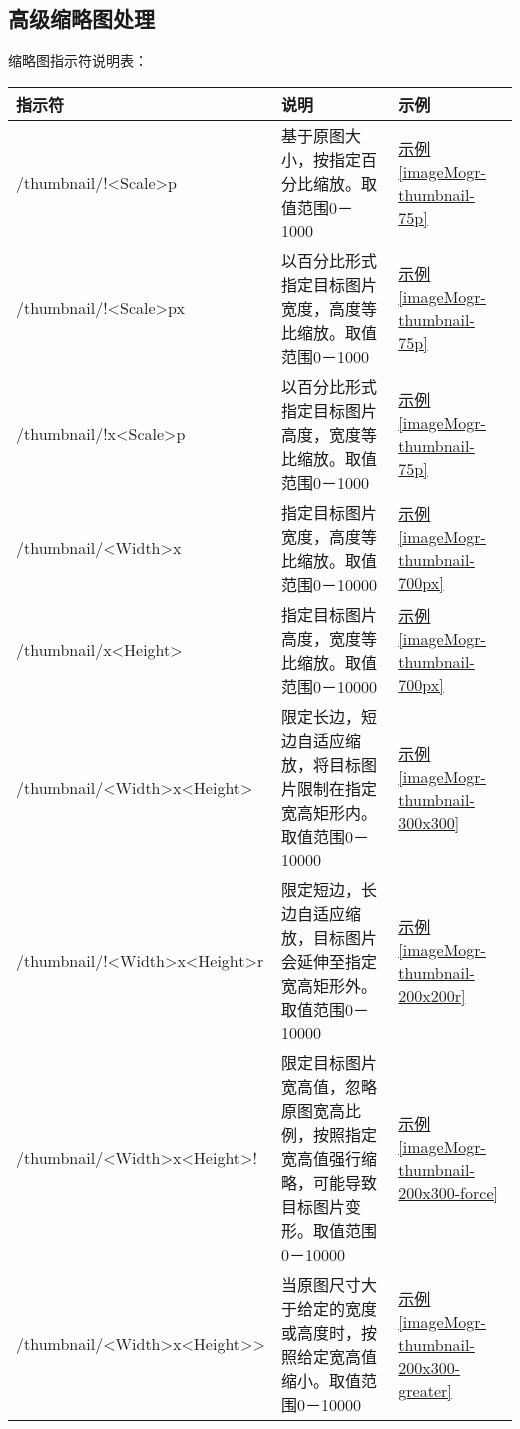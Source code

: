 \documentclass[11pt, oneside]{book}
\newcommand{\qpar}[1]{
\vspace{0.25em}
\noindent
#1\par
\vspace{0.25em}
}
\newcommand{\qtable}[1]{\footnotesize\vspace{0.5em}#1\vspace{0.5em}\normalsize}
\begin{document}
\begin{CJK*}{UTF8}{song}
\clearpage

\subsection{高级缩略图处理}

\qpar{缩略图指示符说明表：}
\qtable{
\label{thumbnail-spec}
\begin{tabular}[t]{|l|p{18em}|p{4em}|}
\hline
指示符 & 说明 & 示例 \\
\hline
/thumbnail/!\textless Scale\textgreater p & 基于原图大小，按指定百分比缩放。取值范围0－1000 & \hyperref[imageMogr-thumbnail-75p]{示例\ref*{imageMogr-thumbnail-75p}} \\
\hline
/thumbnail/!\textless Scale\textgreater px & 以百分比形式指定目标图片宽度，高度等比缩放。取值范围0－1000 & \hyperref[imageMogr-thumbnail-75p]{示例\ref*{imageMogr-thumbnail-75p}} \\
\hline
/thumbnail/!x\textless Scale\textgreater p & 以百分比形式指定目标图片高度，宽度等比缩放。取值范围0－1000 & \hyperref[imageMogr-thumbnail-75p]{示例\ref*{imageMogr-thumbnail-75p}} \\
\hline
/thumbnail/\textless Width\textgreater x & 指定目标图片宽度，高度等比缩放。取值范围0－10000 & \hyperref[imageMogr-thumbnail-700px]{示例\ref*{imageMogr-thumbnail-700px}} \\
\hline
/thumbnail/x\textless Height\textgreater & 指定目标图片高度，宽度等比缩放。取值范围0－10000 & \hyperref[imageMogr-thumbnail-700px]{示例\ref*{imageMogr-thumbnail-700px}} \\
\hline
/thumbnail/\textless Width\textgreater x\textless Height\textgreater & 限定长边，短边自适应缩放，将目标图片限制在指定宽高矩形内。取值范围0－10000 & \hyperref[imageMogr-thumbnail-300x300]{示例\ref*{imageMogr-thumbnail-300x300}} \\
\hline
/thumbnail/!\textless Width\textgreater x\textless Height\textgreater r & 限定短边，长边自适应缩放，目标图片会延伸至指定宽高矩形外。取值范围0－10000 & \hyperref[imageMogr-thumbnail-200x200r]{示例\ref*{imageMogr-thumbnail-200x200r}} \\
\hline
/thumbnail/\textless Width\textgreater x\textless Height\textgreater ! & 限定目标图片宽高值，忽略原图宽高比例，按照指定宽高值强行缩略，可能导致目标图片变形。取值范围0－10000 & \hyperref[imageMogr-thumbnail-200x300-force]{示例\ref*{imageMogr-thumbnail-200x300-force}} \\
\hline
/thumbnail/\textless Width\textgreater x\textless Height\textgreater \textgreater & 当原图尺寸大于给定的宽度或高度时，按照给定宽高值缩小。取值范围0－10000 & \hyperref[imageMogr-thumbnail-200x300-greater]{示例\ref*{imageMogr-thumbnail-200x300-greater}} \\

\end{tabular}}
\end{CJK*}
\end{document}
